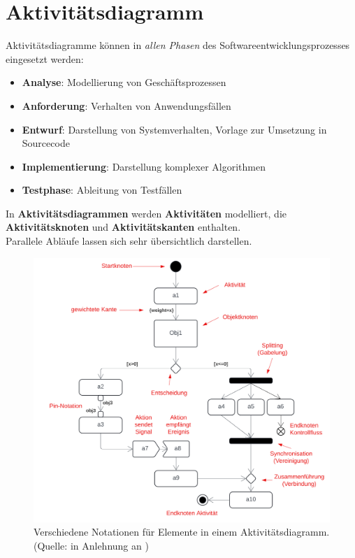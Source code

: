 \section{Aktivitätsdiagramm}

\begin{tcolorbox}[title=Einsatzbereich]
    Aktivitätsdiagramme können in \textit{allen Phasen} des Softwareentwicklungsprozesses eingesetzt werden:

    \begin{itemize}
        \item \textbf{Analyse}: Modellierung von Geschäftsprozessen
        \item \textbf{Anforderung}: Verhalten von Anwendungsfällen
        \item \textbf{Entwurf}: Darstellung von Systemverhalten, Vorlage zur Umsetzung in Sourcecode
        \item \textbf{Implementierung}: Darstellung komplexer Algorithmen
        \item \textbf{Testphase}: Ableitung von Testfällen
    \end{itemize}

    \noindentIn
    In \textbf{Aktivitätsdiagrammen} werden \textbf{Aktivitäten} modelliert, die \textbf{Aktivitätsknoten} und \textbf{Aktivitätskanten} enthalten.\\
    Parallele Abläufe lassen sich sehr übersichtlich darstellen.
\end{tcolorbox}


\begin{figure}
    \centering
    \includegraphics[scale=0.35]{part three/Aktivitätsdiagramme/img/aktivitätsdiagramm-notation}
    \caption{Verschiedene Notationen für Elemente in einem Aktivitätsdiagramm. (Quelle: in Anlehnung an \cite[326, Abb. 6.9-16]{Bal05})}
    \label{fig:aktivitätsdiagramm-notation-cc}
\end{figure}